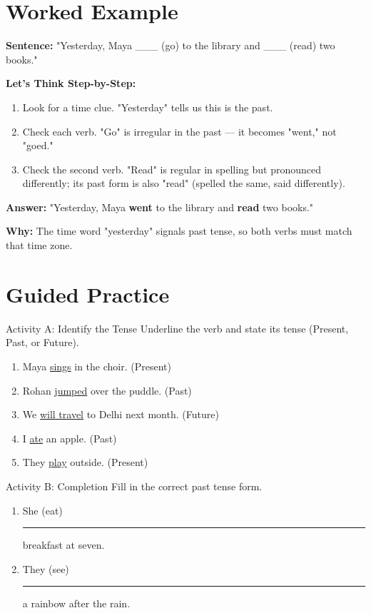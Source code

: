 \section{Worked Example}
\begin{examplebox}
\textbf{Sentence:} "Yesterday, Maya ___ (go) to the library and ___ (read) two books."

\textbf{Let's Think Step-by-Step:}
\begin{enumerate}
    \item Look for a time clue. "Yesterday" tells us this is the past.
    \item Check each verb. "Go" is irregular in the past — it becomes "went," not "goed."
    \item Check the second verb. "Read" is regular in spelling but pronounced differently; its past form is also "read" (spelled the same, said differently).
\end{enumerate}

\textbf{Answer:} "Yesterday, Maya \textbf{went} to the library and \textbf{read} two books."

\textbf{Why:} The time word "yesterday" signals past tense, so both verbs must match that time zone.
\end{examplebox}
\section{Guided Practice}
\begin{activitybox}{Activity A: Identify the Tense}
Underline the verb and state its tense (Present, Past, or Future).
\begin{enumerate}
    \item Maya \underline{sings} in the choir. (Present)
    \item Rohan \underline{jumped} over the puddle. (Past)
    \item We \underline{will travel} to Delhi next month. (Future)
    \item I \underline{ate} an apple. (Past)
    \item They \underline{play} outside. (Present)
\end{enumerate}
\end{activitybox}

\begin{activitybox}{Activity B: Completion}
Fill in the correct past tense form.
\begin{enumerate}
    \item She (eat) \rule{2cm}{0.4pt} breakfast at seven.
    \item They (see) \rule{2cm}{0.4pt} a rainbow after the rain.
\end{enumerate}
\end{activitybox}

